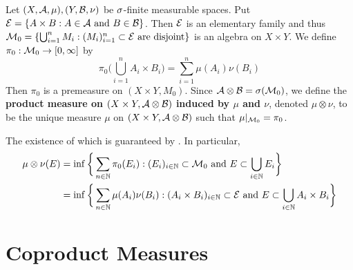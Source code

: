 \documentclass{book}
\begin{document}
	\begin{defn}  
		Let $(X,\mathcal{A}, \mu), (Y,\mathcal{B}, \nu)$ be $\sigma$-finite measurable spaces. Put $\mathcal{E} = \{A \times B: A \in \mathcal{A} \text{ and } B \in \mathcal{B}\}$. Then $\mathcal{E}$ is an elementary family and thus $\mathcal{M}_0 = \{\bigcup_{i =1}^n M_i: (M_i)_{i=1 }^n \subset \mathcal{E} \text{ are disjoint}\}$ is an algebra on $X \times Y$. We define $\pi_0: \mathcal{M}_0 \rightarrow [0,\infty]$ by $$\pi_0\bigg(\bigcup_{i=1}^n A_i \times B_i \bigg) = \sum\limits_{i=1}^n\mu(A_i)\nu(B_i)$$ Then $\pi_0$ is a premeasure on $(X \times Y, M_0)$. Since $\mathcal{A} \otimes \mathcal{B} = \sigma(\mathcal{M}_0)$, we define the \textbf{product measure on $(X \times Y, \mathcal{A} \otimes \mathcal{B})$ induced by $\mu$ and $\nu$}, denoted $\mu \otimes \nu$, to be the unique measure $\mu$ on $(X \times Y, \mathcal{A} \otimes \mathcal{B})$ such that $\mu|_{\mathcal{M}_0} = \pi_0$. 
		
		
		\begin{note}
			The existence of which is guaranteed by . In particular,
			\begin{align*}
				\mu \otimes \nu(E) 
				&= \inf \bigg\{\sum\limits_{n \in \mathbb{N}}\pi_0(E_i): (E_i)_{i \in \mathbb{N}} \subset \mathcal{M}_0 \text{ and } E \subset \bigcup_{i \in \mathbb{N}} E_i \bigg\}\\
				&= \inf \bigg\{\sum\limits_{n \in \mathbb{N}}\mu(A_i)\nu(B_i): (A_i \times B_i)_{i \in \mathbb{N}} \subset \mathcal{E} \text{ and } E \subset \bigcup_{i \in \mathbb{N}} A_i \times B_i \bigg \}
			\end{align*}
		\end{note}
	\end{defn}











































\newpage
\section{Coproduct Measures}
\end{document}
